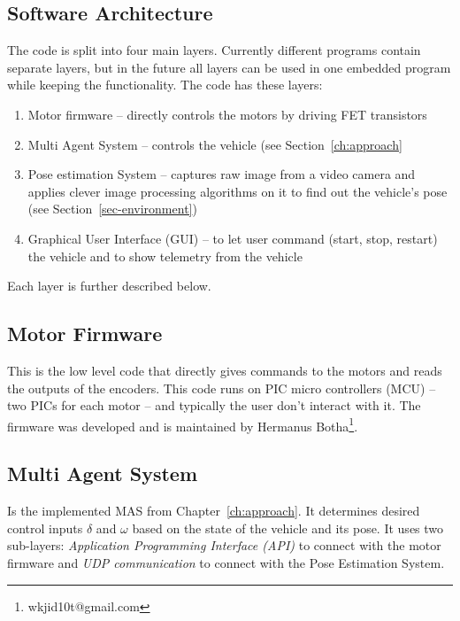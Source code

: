 \begin{appendix}
\chapter{Software Architecture}
\label{a:code}
The code is split into four main layers. Currently different programs contain separate layers, but in the future all layers can be used in one embedded program while keeping the functionality. The code has these layers:
\begin{enumerate}
\item Motor firmware -- directly controls the motors by driving FET transistors
\item Multi Agent System -- controls the vehicle (see Section~\ref{ch:approach}
\item Pose estimation System -- captures raw image from a video camera and applies clever image processing algorithms on it to find out the vehicle's pose (see Section~\ref{sec-environment})
\item Graphical User Interface (GUI) -- to let user command (start, stop, restart) the vehicle and to show telemetry from the vehicle
\end{enumerate}

Each layer is further described below.

\section{Motor Firmware}
\label{a-firmware}
This is the low level code that directly gives commands to the motors and reads the outputs of the encoders. This code runs on PIC micro controllers (MCU) -- two PICs for each motor -- and typically the user don't interact with it. The firmware was developed and is maintained by Hermanus Botha\footnote{wkjid10t@gmail.com}.

\section{Multi Agent System}
\label{a-mas}
Is the implemented MAS from Chapter~\ref{ch:approach}. It determines desired control inputs $\delta$ and $\omega$ based on the state of the vehicle and its pose. It uses two sub-layers: \textit{Application Programming Interface (API)} to connect with the motor firmware and \textit{UDP communication} to connect with the Pose Estimation System.


\end{appendix}
